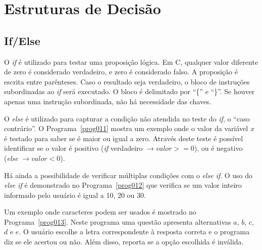\documentclass[11pt,fleqn]{book} %
\begin{document}
\section{Estruturas de Decisão}

\subsection{If/Else}

O \textit{if} é utilizado para testar uma proposição lógica.
Em C, qualquer valor diferente de zero é considerado verdadeiro, e zero é considerado falso.
A proposição é escrita entre parênteses.
Caso o resultado seja verdadeiro, o bloco de instruções subordinadas ao \textit{if} será executado.
O bloco é delimitado por ``\{'' e ``\}''. 
Se houver apenas uma instrução subordinada, não há necessidade das chaves.

O \textit{else} é utilizado para capturar a condição não atendida no teste do \textit{if}, o ``caso contrário''.
O Programa~\ref{prog011} mostra um exemplo onde o valor da variável $x$ é testado para saber se é maior ou igual a zero.
Através deste teste é possível identificar se o valor é positivo (\textit{if} verdadeiro $\rightarrow valor >= 0 $), ou é negativo (\textit{else} $\rightarrow valor < 0$).


Há ainda a possibilidade de verificar múltiplas condições com o \textit{else if}.
O uso do \textit{else if} é demonstrado no Programa~\ref{prog012} que verifica se um valor inteiro informado pelo usuário é igual a 10, 20 ou 30.


Um exemplo onde caracteres podem ser usados é mostrado no Programa~\ref{prog013}.
Neste programa uma questão apresenta alternativas $a$, $b$, $c$, $d$ e $e$. 
O usuário escolhe a letra correspondente à resposta correta e o programa diz se ele acertou ou não. 
Além disso, reporta se a opção escolhida é inválida.


\end{document}
